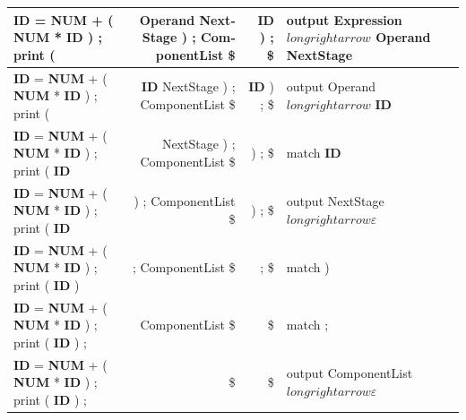 \documentclass{article}
\begin{document}
\begin{latin}
\begin{table}[H]
{\begin{tabular}{|l|r|r|l|}
\textbf{ID} = \textbf{NUM} + ( \textbf{NUM} * \textbf{ID} ) ; print (                 & Operand NextStage ) ; ComponentList \$      & \textbf{ID} ) ; \$                                                                       & output Expression $longrightarrow$ Operand NextStage            \\ \hline
\textbf{ID} = \textbf{NUM} + ( \textbf{NUM} * \textbf{ID} ) ; print (                 & \textbf{ID} NextStage ) ; ComponentList \$  & \textbf{ID} ) ; \$                                                                       & output Operand $longrightarrow$ \textbf{ID}                     \\ \hline
\textbf{ID} = \textbf{NUM} + ( \textbf{NUM} * \textbf{ID} ) ; print ( \textbf{ID}     & NextStage ) ; ComponentList \$              & ) ; \$                                                                                   & match \textbf{ID}                                               \\ \hline
\textbf{ID} = \textbf{NUM} + ( \textbf{NUM} * \textbf{ID} ) ; print ( \textbf{ID}     & ) ; ComponentList \$                        & ) ; \$                                                                                   & output NextStage $longrightarrow \varepsilon$                   \\ \hline
\textbf{ID} = \textbf{NUM} + ( \textbf{NUM} * \textbf{ID} ) ; print ( \textbf{ID} )   & ; ComponentList \$                          & ; \$                                                                                     & match )                                                         \\ \hline
\textbf{ID} = \textbf{NUM} + ( \textbf{NUM} * \textbf{ID} ) ; print ( \textbf{ID} ) ; & ComponentList \$                            & \$                                                                                       & match ;                                                         \\ \hline
\textbf{ID} = \textbf{NUM} + ( \textbf{NUM} * \textbf{ID} ) ; print ( \textbf{ID} ) ; & \$                                          & \$                                                                                       & output ComponentList $longrightarrow \varepsilon$               \\ \hline
\end{tabular}%
}
\end{table}
\end{latin}


\section{}%
\end{document}
